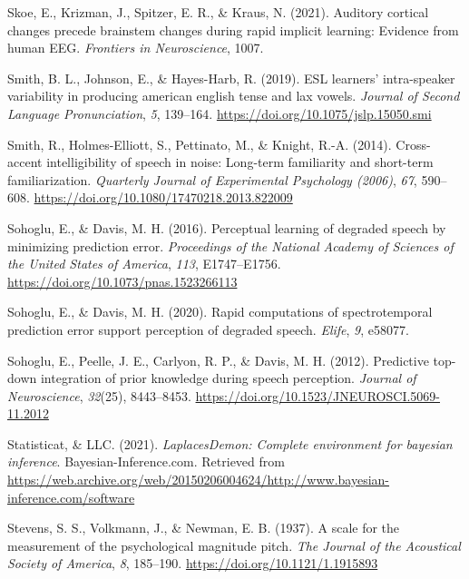 \documentclass[
  11pt,
  english,
  man,floatsintext]{apa6}
\newlength{\cslhangindent}
\newlength{\cslentryspacingunit} %
\newenvironment{CSLReferences}[2] %
 {%
  \setlength{\parindent}{0pt}
  \ifodd #1
  \let\oldpar\par
  \def\par{\hangindent=\cslhangindent\oldpar}
  \fi
  \setlength{\parskip}{#2\cslentryspacingunit}
 }%
 {}
\begin{document}
\begin{CSLReferences}{1}{0}
\leavevmode{}%
Skoe, E., Krizman, J., Spitzer, E. R., \& Kraus, N. (2021). Auditory cortical changes precede brainstem changes during rapid implicit learning: Evidence from human EEG. \emph{Frontiers in Neuroscience}, 1007.

\leavevmode{}%
Smith, B. L., Johnson, E., \& Hayes-Harb, R. (2019). ESL learners' intra-speaker variability in producing american english tense and lax vowels. \emph{Journal of Second Language Pronunciation}, \emph{5}, 139--164. \url{https://doi.org/10.1075/jslp.15050.smi}

\leavevmode{}%
Smith, R., Holmes-Elliott, S., Pettinato, M., \& Knight, R.-A. (2014). Cross-accent intelligibility of speech in noise: Long-term familiarity and short-term familiarization. \emph{Quarterly Journal of Experimental Psychology (2006)}, \emph{67}, 590--608. \url{https://doi.org/10.1080/17470218.2013.822009}

\leavevmode{}%
Sohoglu, E., \& Davis, M. H. (2016). Perceptual learning of degraded speech by minimizing prediction error. \emph{Proceedings of the National Academy of Sciences of the United States of America}, \emph{113}, E1747--E1756. \url{https://doi.org/10.1073/pnas.1523266113}

\leavevmode{}%
Sohoglu, E., \& Davis, M. H. (2020). Rapid computations of spectrotemporal prediction error support perception of degraded speech. \emph{Elife}, \emph{9}, e58077.

\leavevmode{}%
Sohoglu, E., Peelle, J. E., Carlyon, R. P., \& Davis, M. H. (2012). Predictive top-down integration of prior knowledge during speech perception. \emph{Journal of Neuroscience}, \emph{32}(25), 8443--8453. \url{https://doi.org/10.1523/JNEUROSCI.5069-11.2012}

\leavevmode{}%
Statisticat, \& LLC. (2021). \emph{LaplacesDemon: Complete environment for bayesian inference}. Bayesian-Inference.com. Retrieved from \url{https://web.archive.org/web/20150206004624/http://www.bayesian-inference.com/software}

\leavevmode{}%
Stevens, S. S., Volkmann, J., \& Newman, E. B. (1937). A scale for the measurement of the psychological magnitude pitch. \emph{The Journal of the Acoustical Society of America}, \emph{8}, 185--190. \url{https://doi.org/10.1121/1.1915893}


\end{CSLReferences}
\end{document}
